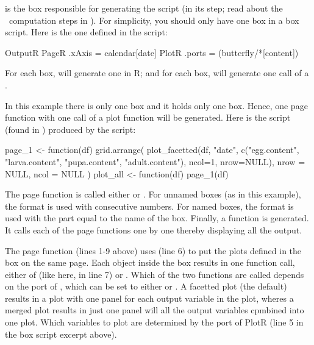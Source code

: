  is the box responsible for generating the script (in its  step; read about the \US\ computation steps in ). For simplicity, you should only have one  box in a box script. Here is the one defined in the  script:

\lstset{numbers=left}
\begin{boxscript}
OutputR {
  PageR {
    .xAxis = calendar[date]
    PlotR {
      .ports = (butterfly/*[content])
    }
  }
}\end{boxscript}
\lstset{numbers=none}

For each  box,  will generate one  in R; and for each  box,  will generate one call of a .

In this example there is only one  box and it holds only one  box. Hence, one page function with one call of a plot function will be generated. Here is the  script (found in ) produced by the  script:
\lstset{numbers=left}
\begin{rscript}
page_1 <- function(df) {
  grid.arrange(
    plot_facetted(df, "date", c("egg.content", 
      "larva.content", "pupa.content", "adult.content"),
      ncol=1, nrow=NULL),
    nrow = NULL,
    ncol = NULL
  )
}
plot_all <- function(df) {
  page_1(df)
}
\end{rscript}
\lstset{numbers=none}

The page function is called either  or . For unnamed  boxes (as in this example), the  format is used with consecutive numbers. For named  boxes, the  format is used with the  part equal to the name of the  box. Finally, a function  is generated. It calls each of the page functions one by one thereby displaying all the output.

The page function (lines 1-9 above) uses  (line 6) to put the plots defined in the  box on the same page. Each  object inside the  box results in one function call, either of  (like here, in line 7) or . Which of the two functions are called depends on the  port of , which can be set to either  or . A facetted plot (the default) results in a plot with one panel for each output variable in the plot, wheres a merged plot results in just one panel will all the output variables cpmbined into one plot. Which variables to plot are determined by the  port of PlotR (line 5 in the box script excerpt above).

